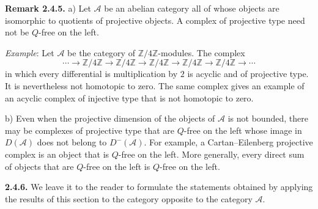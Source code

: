 \clearpage
{}%
\begingroup\small\setlength{\parskip}{0pt}\setlength{\emergencystretch}{1.5em}
\setlength{\abovedisplayskip}{4pt plus 2pt minus 2pt}%
\setlength{\belowdisplayskip}{4pt plus 2pt minus 2pt}%

\noindent\textbf{Remark 2.4.5.}\quad
a) Let $\mathcal A$ be an abelian category all of whose objects are
isomorphic to quotients of projective objects. A complex of projective type
need not be $Q$-free on the left.

\emph{Example}: Let $\mathcal A$ be the category of
$\mathbb Z/4\mathbb Z$-modules. The complex
\[
\cdots\longrightarrow\mathbb Z/4\mathbb Z
\longrightarrow\mathbb Z/4\mathbb Z
\longrightarrow\mathbb Z/4\mathbb Z
\longrightarrow\mathbb Z/4\mathbb Z
\longrightarrow\mathbb Z/4\mathbb Z\longrightarrow\cdots
\]
in which every differential is multiplication by $2$ is acyclic and of
projective type. It is nevertheless not homotopic to zero. The same
complex gives an example of an acyclic complex of injective type that is
not homotopic to zero.

b) Even when the projective dimension of the objects of $\mathcal A$ is
not bounded, there may be complexes of projective type that are $Q$-free
on the left whose image in $D(\mathcal A)$ does not belong to
$D^{-}(\mathcal A)$. For example, a Cartan--Eilenberg projective complex
is an object that is $Q$-free on the left. More generally, every direct sum
of objects that are $Q$-free on the left is $Q$-free on the left.

\medskip\noindent\textbf{2.4.6.}\quad
We leave it to the reader to formulate the statements obtained by applying
the results of this section to the category opposite to the category
$\mathcal A$.
\endgroup

